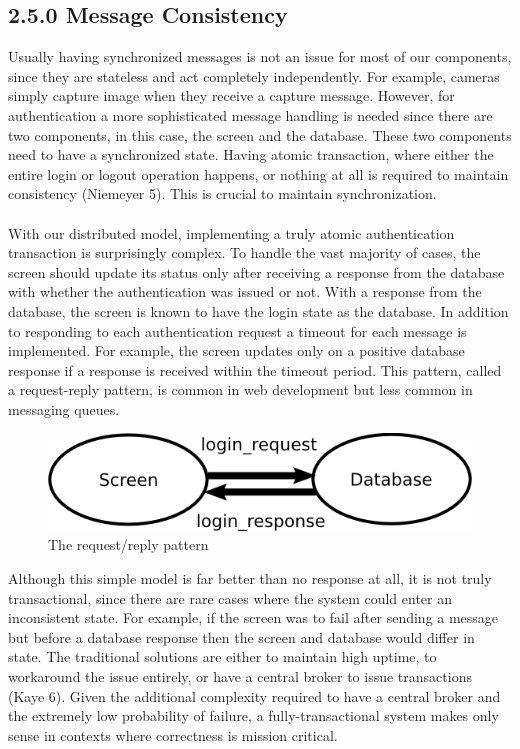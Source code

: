 \documentclass[12pt]{report}
\begin{document}
\subsection*{2.5.0 Message Consistency}
Usually having synchronized messages is not an issue for most of our components, since they are stateless and act completely independently. For example, cameras simply capture image when they receive a capture message. However, for authentication a more sophisticated message handling is needed since there are two components, in this case, the screen and the database. These two components need to have a synchronized state. Having atomic transaction, where either the entire login or logout operation happens, or nothing at all is required to maintain consistency (Niemeyer 5). This is crucial to maintain synchronization. \\ \\
With our distributed model, implementing a truly atomic authentication transaction is surprisingly complex. To handle the vast majority of cases, the screen should update its status only after receiving a response from the database with whether the authentication was issued or not. With a response from the database, the screen is known to have the login state as the database. In addition to responding to each authentication request a timeout for each message is implemented. For example, the screen updates only on a positive database response if a response is received within the timeout period. This pattern, called a request-reply pattern, is common in web development but less common in messaging queues.
\begin{figure}[h]
\centering
\includegraphics[scale=0.55]{communication}
\caption{The request/reply pattern}
\end{figure}
\noindent
Although this simple model is far better than no response at all, it is not truly transactional, since there are rare cases where the system could enter an inconsistent state. For example, if the screen was to fail after sending a message but before a database response then the screen and database would differ in state. The traditional solutions are either to maintain high uptime, to workaround the issue entirely, or have a central broker to issue transactions (Kaye 6). Given the additional complexity required to have a central broker and the extremely low probability of failure, a fully-transactional system makes only sense in contexts where correctness is mission critical.
\end{document}
